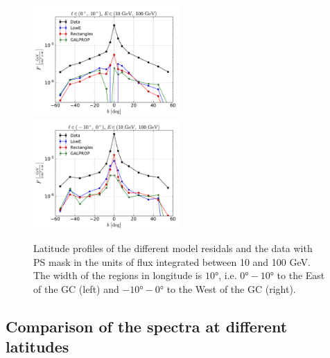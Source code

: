 \begin{figure}[h]
\includegraphics[width=0.5\textwidth]{plots/Profiles_l=1_source_range_1.pdf}
\includegraphics[width=0.5\textwidth]{plots/Profiles_l=0_source_range_1.pdf}
  	\caption{Latitude profiles of the different model residals and the data with PS mask in 
	the units of flux integrated between 10 and 100 GeV. 
	The width of the regions in longitude is $\ang{10}$, i.e. $\ang{0} - \ang{10}$ to the East of the GC (left) and $\ang{-10} - \ang{0}$ to the West of the GC (right).}
  	\label{fig:Profiles}
\end{figure}

\subsection{Comparison of the spectra at different latitudes}

